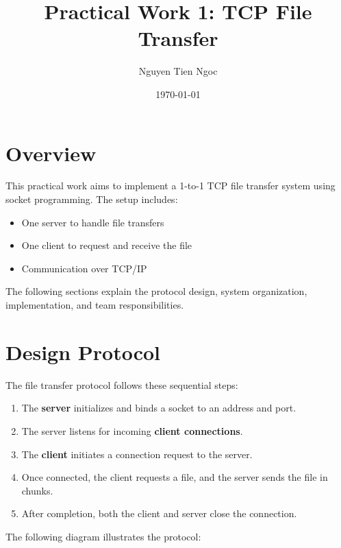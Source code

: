 \documentclass[a4paper,12pt]{article}
\title{Practical Work 1: TCP File Transfer}
\author{Nguyen Tien Ngoc}
\date{\today}
\begin{document}
\maketitle

\section*{Overview}
This practical work aims to implement a 1-to-1 TCP file transfer system using socket programming. The setup includes:
\begin{itemize}
    \item One server to handle file transfers
    \item One client to request and receive the file
    \item Communication over TCP/IP
\end{itemize}

The following sections explain the protocol design, system organization, implementation, and team responsibilities.

\section*{Design Protocol}
The file transfer protocol follows these sequential steps:
\begin{enumerate}
    \item The \textbf{server} initializes and binds a socket to an address and port.
    \item The server listens for incoming \textbf{client connections}.
    \item The \textbf{client} initiates a connection request to the server.
    \item Once connected, the client requests a file, and the server sends the file in chunks.
    \item After completion, both the client and server close the connection.
\end{enumerate}

The following diagram illustrates the protocol:
\end{document}
